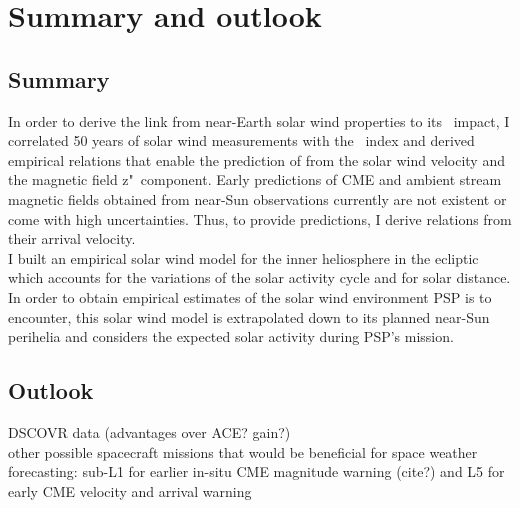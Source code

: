 
\chapter{Summary and outlook}
\label{chap:summary}


% 

\section{Summary}

In order to derive the link from near-Earth solar wind properties to its \Kp{}~impact, I correlated 50 years of solar wind measurements with the \Kp~index and derived empirical relations that enable the prediction of \Kp{} from the solar wind velocity and the magnetic field z"~component. Early predictions of CME and ambient stream magnetic fields obtained from near-Sun observations currently are not existent or come with high uncertainties. Thus, to provide \Kp{} predictions, I derive relations from their arrival velocity.\\


I built an empirical solar wind model for the inner heliosphere in the ecliptic which accounts for the variations of the solar activity cycle and for solar distance. In order to obtain empirical estimates of the solar wind environment PSP is to encounter, this solar wind model is extrapolated down to its planned near-Sun perihelia and considers the expected solar activity during PSP's mission.\\



\section{Outlook}


DSCOVR data (advantages over ACE? gain?)\\

other possible spacecraft missions that would be beneficial for space weather forecasting: sub-L1 for earlier in-situ CME magnitude warning (cite?) and L5 for early CME velocity and arrival warning \citep{Vourlidas2015}\\


